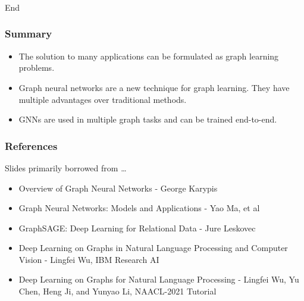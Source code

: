 \begin{frame}[fragile]\frametitle{}
\begin{center}
{\Large End}
\end{center}
\end{frame}

\begin{frame}[fragile]\frametitle{Summary}

\begin{itemize}
\item The solution to many applications can be formulated as graph learning problems.
\item Graph neural networks are a new technique for graph learning. They have multiple advantages over traditional methods.
\item GNNs are used in multiple graph tasks and can be trained end-to-end.
\end{itemize}

\end{frame}

\begin{frame}[fragile]\frametitle{References}
Slides primarily borrowed from \ldots

\begin{itemize}
\item Overview of Graph Neural Networks - George Karypis
\item Graph Neural Networks: Models and Applications - Yao Ma, et al
\item GraphSAGE: Deep Learning for Relational Data - Jure Leskovec
\item Deep Learning on Graphs in Natural Language Processing and Computer Vision - Lingfei Wu, IBM Research AI
\item Deep Learning on Graphs for Natural Language Processing - Lingfei Wu, Yu Chen, Heng Ji, and Yunyao Li, NAACL-2021 Tutorial

\end{itemize}

\end{frame}
